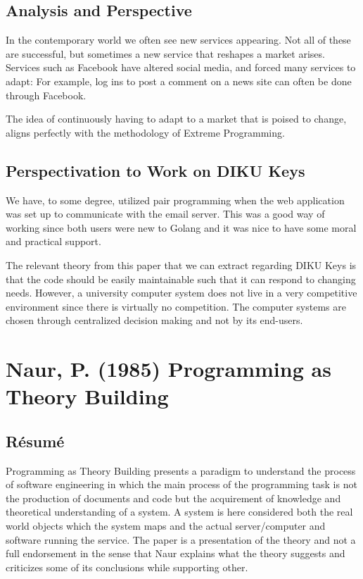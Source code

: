 \documentclass[11pt,a4paper]{report}
\begin{document}
\subsection{Analysis and Perspective}
In the contemporary world we often see new services appearing. Not all of these are successful, but sometimes a new service that reshapes a market arises. Services such as Facebook have altered social media, and forced many services to adapt: For example, log ins to post a comment on a news site can often be done through Facebook.

The idea of continuously having to adapt to a market that is poised to change, aligns perfectly with the methodology of Extreme Programming.

\subsection{Perspectivation to Work on DIKU Keys}
We have, to some degree, utilized pair programming when the web application was set up to communicate with the email server. This was a good way of working since both users were new to Golang and it was nice to have some moral and practical support.

The relevant theory from this paper that we can extract regarding DIKU Keys is that the code should be easily maintainable such that it can respond to changing needs. However, a university computer system does not live in a very competitive environment since there is virtually no competition. The computer systems are chosen through centralized decision making and not by its end-users.

\section{Naur, P. (1985) Programming as Theory Building}
\subsection{Résumé}
Programming as Theory Building presents a paradigm to understand the process of software engineering in which the main process of the programming task is not the production of documents and code but the acquirement of knowledge and theoretical understanding of a system. A system is here considered both the real world objects which the system maps and the actual server/computer and software running the service. The paper is a presentation of the theory and not a full endorsement in the sense that Naur explains what the theory suggests and criticizes some of its conclusions while supporting other.
\end{document}
